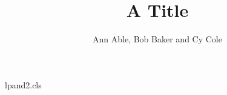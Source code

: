 \begin{filecontents*}[overwrite]{lpand2.cls}
\long\def\affiliations#1{\gdef\@affiliations{#1}}
\let\institute\affiliations
\def\inst#1{\unskip\textsuperscript{#1}}
\def\set@affiliations{\par\parindent=0pt\setcounter{inst}{0}\refstepcounter{inst}%
  \def\and{\par\refstepcounter{inst}\textsuperscript{\theinst}\ignorespaces}%
  \textsuperscript{\theinst}\ignorespaces\@affiliations}
\def\ps@firstpage{\def\@oddhead{}\def\@oddfoot{\vbox to 0pt{\affiliationsbox\vss}}\let\@evenfoot\@oddfoot}
\def\@maketitle{\begin{center}{\LARGE\@title\par}\vskip1em{\large\@author\par}\end{center}\vskip1em}
\renewcommand\maketitle{\par\begingroup\@maketitle\endgroup
  \def\affiliationsbox{\parbox[b]{\textwidth}{\small\set@affiliations}}%
  \thispagestyle{firstpage}}
\end{filecontents*}
\documentclass{lpand2}

\title{A Title}
\author{Ann Able, Bob Baker and Cy Cole}
\maketitle
Text.

